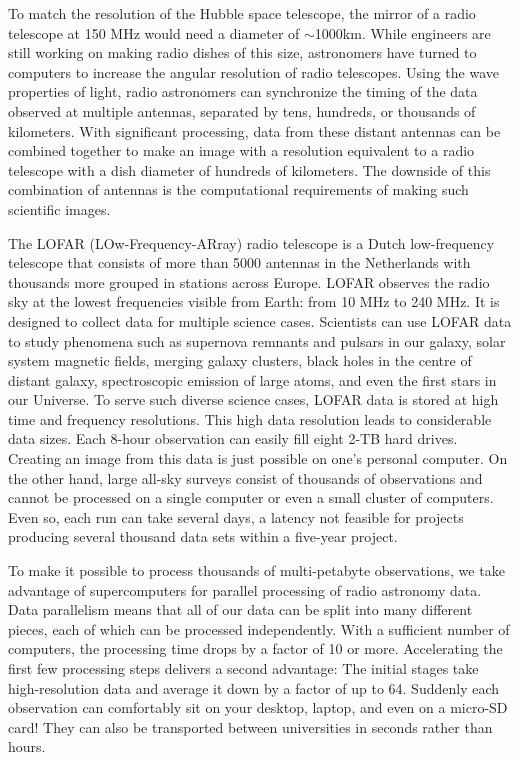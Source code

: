 To match the resolution of the Hubble space telescope, the mirror of a radio telescope at 150 MHz would need a diameter of $\sim$1000km. While engineers are still working on making radio dishes of this size, astronomers have turned to computers to increase the angular resolution of radio telescopes. Using the wave properties of light, radio astronomers can synchronize the timing of the data observed at multiple antennas, separated by tens, hundreds, or thousands of kilometers. With significant processing, data from these distant antennas can be combined together to make an image with a resolution equivalent to a radio telescope with a dish diameter of hundreds of kilometers. The downside of this combination of antennas is the computational requirements of making such  scientific images.

The LOFAR (LOw-Frequency-ARray) radio telescope is a Dutch low-frequency telescope that consists of more than 5000 antennas in the Netherlands with thousands more grouped in stations across Europe. LOFAR observes the radio sky at the lowest frequencies visible from Earth: from 10 MHz to 240 MHz. It is designed to collect data for multiple science cases. Scientists can use LOFAR data to study phenomena such as supernova remnants and pulsars in our galaxy, solar system magnetic fields, merging galaxy clusters, black holes in the centre of distant galaxy, spectroscopic emission of large atoms, and even the first stars in our Universe. To serve such diverse science cases, LOFAR data is stored at high time and frequency resolutions. This high data resolution leads to considerable data sizes. Each 8-hour observation can easily fill eight 2-TB hard drives. Creating an image from this data is just possible on one's personal computer. On the other hand, large all-sky surveys consist of thousands of observations and cannot be processed on a single computer or even a small cluster of computers. Even so, each run can take several days, a latency not feasible for projects producing several thousand data sets within a five-year project.

To make it possible to process thousands of multi-petabyte observations, we take advantage of supercomputers for parallel processing of radio astronomy data. Data parallelism means that all of our data can be split into many different pieces, each of which can be processed independently. With a sufficient number of computers, the processing time drops by a factor of 10 or more. Accelerating the first few processing steps delivers a second advantage: The initial stages take high-resolution data and average it down by a factor of up to 64. Suddenly each observation can comfortably sit on your desktop, laptop, and even on a micro-SD card! They can also be transported between universities in seconds rather than hours. 

